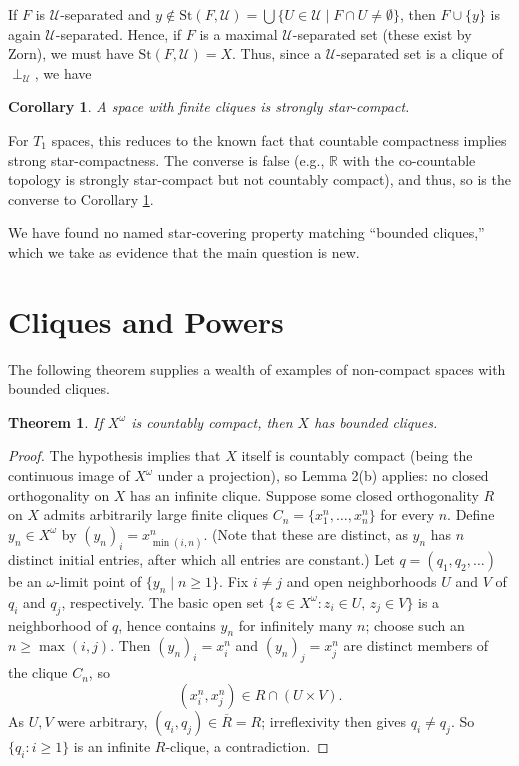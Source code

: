 \documentclass[12pt]{article}
\newcommand{\R}{{\mathbb R}}
\newcommand{\st}{\mbox{St}}
\theoremstyle{plain}
\newtheorem{theorem}{Theorem}
\newtheorem{corollary}{Corollary}
\theoremstyle{definition}
\theoremstyle{remark}
\begin{document}
If $F$ is $\mathcal U$-separated and 
$y \not \in \st(F,{\mathcal U}) = \bigcup\{ U \in {\mathcal U} \mid F \cap U \not = \emptyset\}$, then 
$F \cup \{y\}$ is again $\mathcal U$-separated. Hence, 
if $F$ is a maximal $\mathcal U$-separated set (these 
exist by Zorn), we must have $\st(F,{\mathcal U}) = X$. Thus, since a ${\mathcal U}$-separated set is a clique 
of $\perp_{\mathcal U}$, we have 

\begin{corollary}\label{starcompact} A space with finite cliques is strongly star-compact.
\end{corollary} 

For $T_1$ spaces, this reduces to the known 
fact that countable compactness implies strong star-compactness. The converse is false (e.g., $\R$ with the co-countable topology is strongly star-compact but 
not countably compact), and thus, so is the converse to Corollary \ref{starcompact}. 

We have found no named star-covering property matching ``bounded cliques,'' which we take as evidence that the main question is new.


\section{Cliques and Powers}

The following theorem supplies a wealth of 
examples of non-compact spaces with bounded cliques.

\begin{theorem}\label{omegapower}
If $X^{\omega}$ is countably compact, then $X$ has bounded cliques.
\end{theorem}

\begin{proof} 
The hypothesis implies that $X$ itself is countably compact (being the continuous image of $X^{\omega}$ under a projection), so Lemma 2(b) applies: no  closed orthogonality on $X$ has an infinite clique.  
Suppose some closed orthogonality $R$ on $X$ admits  arbitrarily large finite cliques $C_n = \{x^n_1, \dots, x^n_n\}$ for every $n$.
 Define $y_n \in X^{\omega}$ by $(y_n)_i = x^n_{\min(i,n)}$. (Note that these 
 are distinct, as $y_{n}$ has $n$ distinct initial 
 entries, after which all entries are constant.) 
Let $q = (q_1, q_2, \dots)$ 
be an $\omega$-limit point of $\{y_n \mid n \geq 1\}$.
Fix $i \neq j$ and open neighborhoods $U$ and $V$ of $q_i$ and $q_j$, respectively.
The basic open set $\{z \in X^\omega : z_i \in U, \, z_j \in V\}$ is a neighborhood of $q$, hence contains $y_n$ for infinitely many $n$; choose such an $n \geq \max(i,j)$. Then $(y_n)_i = x^n_i$ and $(y_n)_j = x^n_j$ are distinct members of the clique $C_n$, so
\[ (x^n_i, x^n_j) \in R \cap (U \times V). \]
As $U, V$ were arbitrary, $(q_i, q_j) \in \overline{R} = R$; irreflexivity then gives $q_i \neq q_j$. So $\{q_i : i \geq 1\}$ is an infinite $R$-clique, 
a contradiction.
\end{proof}
\end{document}

